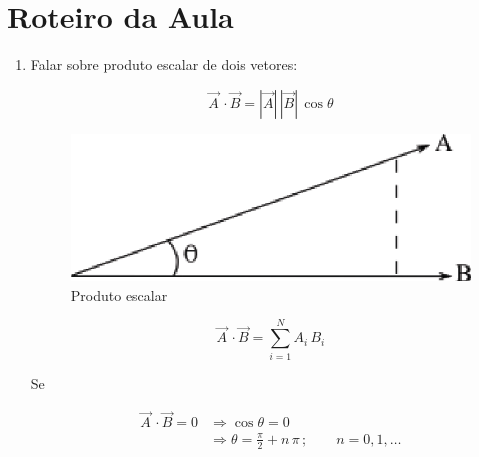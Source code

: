 \section{Roteiro da Aula}

\begin{enumerate}

\item
Falar sobre produto escalar de dois vetores:

\[
 \vec A \, \cdot \vec B = |\vec A| \, |\vec B| \, \cos \theta
\]

\begin{figure}[htb]
    \centering
    \includegraphics[scale=0.8]{capitulos/capitulo2/figuras/roteiro_da_aula1.eps}
    \caption{Produto escalar}
    \label{fig:roteiro_da_aula1}
\end{figure}

\[
 \vec A \, \cdot \vec B = \sum_{i=1}^N A_i \, B_i
\]

Se

\[
   \begin{array}{ll}
     \vec A \, \cdot \vec B = 0 & \Rightarrow \cos \theta = 0 \\
                                & \Rightarrow \theta = \displaystyle \frac{\pi}{2} + n\,\pi\,; \qquad n = 0, 1, \ldots \\
   \end{array}
\]


\end{enumerate}

